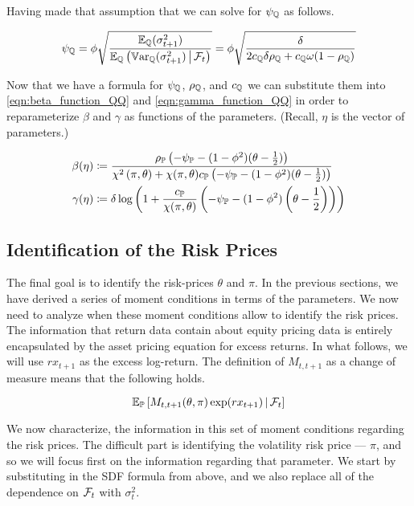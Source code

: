 \documentclass[11pt, letterpaper, twoside, final]{article}
\begin{document}
Having made that assumption that we can solve for $\psi_{\mathbb{Q}}$ as follows.

\begin{equation}
    \psi_{\mathbb{Q}} =  \phi \sqrt{\frac{\operatorname{\mathbb{E}}_{\mathbb{Q}}(\sigma^2_{t+1})}{\operatorname{\mathbb{E}}_{\mathbb{Q}}\left(\operatorname{\mathbb{V}ar}_{\mathbb{Q}}(\sigma^2_{t+1}) \,\middle\vert\, \mathcal{F}_t
    \right)}}
    = \phi \sqrt{\frac{\delta}{2 c_{\mathbb{Q}} \delta \rho_{\mathbb{Q}} + c_{\mathbb{Q}} \omega (1 - \rho_{\mathbb{Q}})}}
    \label{eqn:psi_function}
\end{equation}

Now that we have a formula for $\psi_{\mathbb{Q}}$, $\rho_{\mathbb{Q}}$, and $c_{\mathbb{Q}}$ we can substitute them into
\cref{eqn:beta_function_QQ}  and \cref{eqn:gamma_function_QQ} in order to reparameterize $\beta$ and $\gamma$ as
functions of the parameters.
(Recall, $\eta$ is the vector of parameters.)

\begin{align}
    \label{eqn:beta_function}
    \beta(\eta) &\coloneqq \frac{\rho_{\PP} \left(-\psi_{\PP} - (1- \phi^2)(\theta -
    \frac{1}{2})\right)}{\chi^2\left(\pi, \theta\right) + \chi(\pi, \theta)c_{\PP} \left(-\psi_{\PP} - (1-
    \phi^2)(\theta-\frac{1}{2} )\right)}  \\
%
    \label{eqn:gamma_function}
    \gamma(\eta) &\coloneqq \delta \log\left(1 + \frac{c_{\PP}}{\chi(\pi,\theta)} \left(-\psi_{\PP} - (1-
    \phi^2)\left(\theta - \frac{1}{2}\right) \right)\right)
\end{align}

\subsection{Identification of the Risk Prices}

The final goal is to identify the risk-prices $\theta$ and $\pi$.
In the previous sections, we have derived a series of moment conditions in terms of the parameters.
We now need to analyze when these moment conditions allow to identify the risk prices. 
The information that return data contain about equity pricing data is entirely encapsulated by the asset pricing
equation for excess returns.  
In what follows, we will use $rx_{t+1}$ as the excess log-return.
The definition of $M_{t,t+1}$ as a change of measure means that the following holds.

\begin{equation}
    \operatorname{\mathbb{E}}_{\mathbb{P}}\left[ M_{t,t+1}(\theta, \pi) \exp(rx_{t+1}) \,\middle\vert\, \mathcal{F}_{t} \right]
\end{equation}

We now characterize, the information in this set of moment conditions regarding the risk prices.
The difficult part is identifying the volatility risk price --- $\pi$, and so we will focus first on the
information regarding that parameter.
We start by substituting in the SDF formula from above, and we also replace all of the dependence on $\mathcal{F}_t$ with
$\sigma^2_t$.
\end{document}
